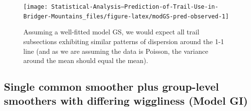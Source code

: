 \documentclass[
]{book}
\newenvironment{Shaded}{\begin{snugshade}}{\end{snugshade}}
\newcommand{\AttributeTok}[1]{\textcolor[rgb]{0.77,0.63,0.00}{#1}}
\newcommand{\CommentTok}[1]{\textcolor[rgb]{0.56,0.35,0.01}{\textit{#1}}}
\newcommand{\DecValTok}[1]{\textcolor[rgb]{0.00,0.00,0.81}{#1}}
\newcommand{\FloatTok}[1]{\textcolor[rgb]{0.00,0.00,0.81}{#1}}
\newcommand{\FunctionTok}[1]{\textcolor[rgb]{0.00,0.00,0.00}{#1}}
\newcommand{\NormalTok}[1]{#1}
\newcommand{\OtherTok}[1]{\textcolor[rgb]{0.56,0.35,0.01}{#1}}
\newcommand{\SpecialCharTok}[1]{\textcolor[rgb]{0.00,0.00,0.00}{#1}}
\newcommand{\StringTok}[1]{\textcolor[rgb]{0.31,0.60,0.02}{#1}}
\begin{document}
\begin{Shaded}
\end{Shaded}

\begin{figure}

{\centering \texttt{[image: Statistical-Analysis--Prediction-of-Trail-Use-in-Bridger-Mountains\_files/figure-latex/modGS-pred-observed-1]} 

}

\caption{Assuming a well-fitted model GS, we would expect all trail subsections exhibiting similar patterns of dispersion around the 1-1 line (and as we are assuming the data is Poisson, the variance around the mean should equal the mean).}\label{fig:modGS-pred-observed}
\end{figure}

\hypertarget{single-common-smoother-plus-group-level-smoothers-with-differing-wiggliness-model-gi}{%
\subsection{Single common smoother plus group-level smoothers with differing wiggliness (Model GI)}\label{single-common-smoother-plus-group-level-smoothers-with-differing-wiggliness-model-gi}}
\end{document}

